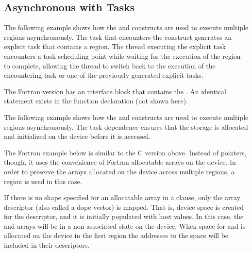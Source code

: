 \subsection{Asynchronous  with Tasks}
\label{subsec:async_target_with_tasks}



The following example shows how the  and  constructs 
are used to execute multiple  regions asynchronously. The task that 
encounters the  construct generates an explicit task that contains 
a  region. The thread executing the explicit task encounters a task 
scheduling point while waiting for the execution of the  region 
to complete, allowing the thread to switch back to the execution of the encountering 
task or one of the previously generated explicit tasks.


\pagebreak
{}
The Fortran version has an interface block that contains the  . 
An identical statement exists in the function declaration (not shown here).


The following example shows how the  and  constructs 
are used to execute multiple  regions asynchronously. The task dependence 
ensures that the storage is allocated and initialized on the device before it is 
accessed.


The Fortran example below is similar to the C version above. Instead of pointers, though, it uses
the convenience of Fortran allocatable arrays on the device. In order to preserve the arrays 
allocated on the device across multiple  regions, a ~ region 
is used in this case.

If there is no shape specified for an allocatable array in a  clause, only the array descriptor
(also called a dope vector) is mapped. That is, device space is created for the descriptor, and it
is initially populated with host values. In this case, the  and  arrays will be in a
non-associated state on the device. When space for  and  is allocated on the device
in the first  region the addresses to the space will be included in their descriptors.

